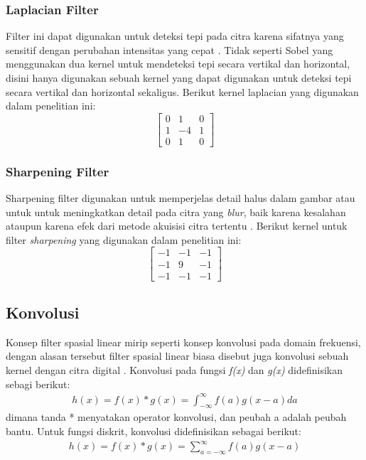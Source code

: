 \subsubsection{Laplacian Filter}
Filter ini dapat digunakan untuk deteksi tepi pada citra karena sifatnya yang sensitif dengan perubahan intensitas yang cepat . Tidak seperti Sobel yang menggunakan dua kernel untuk mendeteksi tepi secara vertikal dan horizontal, disini hanya digunakan sebuah kernel yang dapat digunakan untuk deteksi tepi secara vertikal dan horizontal sekaligus. Berikut kernel laplacian yang digunakan dalam penelitian ini:
\begin{equation*}
    \label{kernel:laplasHP}
    \left[
    \begin{matrix}
        0 & 1 & 0 \\
        1 & -4 & 1 \\
        0 & 1 & 0
    \end{matrix}
    \right]
\end{equation*}

\subsubsection{Sharpening Filter}
Sharpening filter digunakan untuk memperjelas detail halus dalam gambar atau untuk untuk meningkatkan detail pada citra yang \textit{blur}, baik karena kesalahan ataupun karena efek dari metode akuisisi citra tertentu . Berikut kernel untuk filter \textit{sharpening} yang digunakan dalam penelitian ini:
\begin{equation*}
    \label{kernel:sharpening}
    \left[
    \begin{matrix}
        -1 & -1 & -1 \\
        -1 & 9 & -1 \\
        -1 & -1 & -1
    \end{matrix}
    \right]
\end{equation*}


\subsection{Konvolusi}
Konsep filter spasial linear mirip seperti konsep konvolusi pada domain frekuensi, dengan alasan tersebut filter spasial linear biasa disebut juga konvolusi sebuah kernel dengan citra digital . Konvolusi pada fungsi \textit{f(x)} dan \textit{g(x)} didefinisikan sebagi berikut:
\begin{equation}
    \label{eq:conv1}
    \begin{split}
        h(x) = f(x) * g(x) = \int_{-\infty}^{\infty} f(a) g(x-a) da
    \end{split}
\end{equation}
dimana tanda * menyatakan operator konvolusi, dan peubah a adalah peubah bantu. Untuk fungsi diskrit, konvolusi didefinisikan sebagai berikut:
\begin{equation}
    \label{eq:conv2}
    \begin{split}
         h(x) = f(x) * g(x) = \sum_{a=-\infty}^{\infty} f(a)g(x-a)
    \end{split}
\end{equation}

